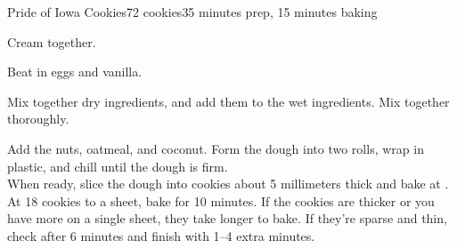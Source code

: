 \documentclass[../Cookbook.tex]{subfiles}
\begin{document}
\begin{recipe}{Pride of Iowa Cookies}{72 cookies}{35 minutes prep, 15 minutes baking}

	Cream together.

	Beat in eggs and vanilla.

	Mix together dry ingredients, and add them to the wet ingredients. Mix together thoroughly.

	Add the nuts, oatmeal, and coconut. Form the dough into two rolls, wrap in plastic, and chill until the dough is firm.\\
	When ready, slice the dough into cookies about 5 millimeters thick and bake at .
	At 18 cookies to a sheet, bake for 10 minutes.
	If the cookies are thicker or you have more on a single sheet, they take longer to bake.
	If they're sparse and thin, check after 6 minutes and finish with 1--4 extra minutes.

\end{recipe}
\end{document}
